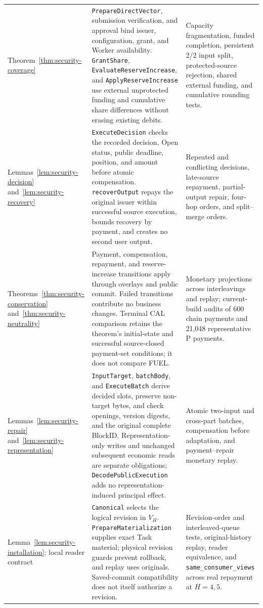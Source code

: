 \begin{table}[t]
\begin{tabular}{@{}p{}
                    p{}
                    p{}@{}}
Theorem~\ref{thm:security-coverage} &
\texttt{PrepareDirectVector}, submission verification, and approval
bind issuer, configuration, grant, and Worker availability.
\texttt{GrantShare}, \texttt{EvaluateReserveIncrease}, and
\texttt{ApplyReserveIncrease} use external unprotected funding and
cumulative share differences without erasing existing debits. &
Capacity fragmentation, funded completion, persistent 2/2 input split,
protected-source rejection, shared external funding, and cumulative
rounding tests. \\

Lemmas~\ref{lem:security-decision}
and~\ref{lem:security-recovery} &
\texttt{ExecuteDecision} checks the recorded decision, Open status,
public deadline, position, and amount before atomic compensation.
\texttt{recoverOutput} repays the original issuer within successful
source execution, bounds recovery by payment, and creates no second
user output. &
Repeated and conflicting decisions, late-source repayment, partial-output
repair, four-hop orders, and split--merge orders. \\

Theorems~\ref{thm:security-conservation}
and~\ref{thm:security-neutrality} &
Payment, compensation, repayment, and reserve-increase transitions
apply through overlays and public commit. Failed transitions contribute
no business changes. Terminal CAL comparison retains the theorem's
initial-state and successful source-closed payment-set conditions;
it does not compare FUEL. &
Monetary projections across interleavings and replay; current-build
audits of 600 chain payments and 21,048 representative P payments. \\

Lemmas~\ref{lem:security-repair}
and~\ref{lem:security-representation} &
\texttt{InputTarget}, \texttt{batchBody}, and \texttt{ExecuteBatch}
derive decided slots, preserve non-target bytes, and check openings,
version digests, and the original complete BlockID.
Representation-only writes and unchanged subsequent economic reads
are separate obligations; \texttt{DecodePublicExecution} adds no
representation-induced principal effect. &
Atomic two-input and cross-part batches, compensation before adaptation,
and payment--repair monetary replay. \\

Lemma~\ref{lem:security-installation};
local reader contract &
\texttt{Canonical} selects the logical revision in $V_H$.
\texttt{PrepareMaterialization} supplies exact Task material;
physical revision guards prevent rollback, and replay uses originals.
Saved-commit compatibility does not itself authorize a revision. &
Revision-order and interleaved-queue tests, original-history replay,
reader equivalence, and \texttt{same\_consumer\_views} across real
repayment at $H=4,5$. \\


\end{tabular}
\end{table}
